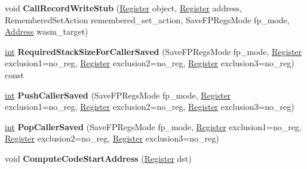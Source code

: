 \begin{DoxyCompactItemize}
void {\bfseries Call\+Record\+Write\+Stub} (\mbox{\hyperlink{classv8_1_1internal_1_1Register}{Register}} object, \mbox{\hyperlink{classv8_1_1internal_1_1Register}{Register}} address, Remembered\+Set\+Action remembered\+\_\+set\+\_\+action, Save\+F\+P\+Regs\+Mode fp\+\_\+mode, \mbox{\hyperlink{classuintptr__t}{Address}} wasm\+\_\+target)
\item 
\mbox{\label{classv8_1_1internal_1_1TurboAssembler_ade281f6d328e2fdd51963e91bda13365}} 
\mbox{\hyperlink{classint}{int}} {\bfseries Required\+Stack\+Size\+For\+Caller\+Saved} (Save\+F\+P\+Regs\+Mode fp\+\_\+mode, \mbox{\hyperlink{classv8_1_1internal_1_1Register}{Register}} exclusion1=no\+\_\+reg, \mbox{\hyperlink{classv8_1_1internal_1_1Register}{Register}} exclusion2=no\+\_\+reg, \mbox{\hyperlink{classv8_1_1internal_1_1Register}{Register}} exclusion3=no\+\_\+reg) const
\item 
\mbox{\label{classv8_1_1internal_1_1TurboAssembler_a05799e0b139129becdabdf8af8e18810}} 
\mbox{\hyperlink{classint}{int}} {\bfseries Push\+Caller\+Saved} (Save\+F\+P\+Regs\+Mode fp\+\_\+mode, \mbox{\hyperlink{classv8_1_1internal_1_1Register}{Register}} exclusion1=no\+\_\+reg, \mbox{\hyperlink{classv8_1_1internal_1_1Register}{Register}} exclusion2=no\+\_\+reg, \mbox{\hyperlink{classv8_1_1internal_1_1Register}{Register}} exclusion3=no\+\_\+reg)
\item 
\mbox{\label{classv8_1_1internal_1_1TurboAssembler_a5f104f3d3c969b063fb4d1dfdc643b1c}} 
\mbox{\hyperlink{classint}{int}} {\bfseries Pop\+Caller\+Saved} (Save\+F\+P\+Regs\+Mode fp\+\_\+mode, \mbox{\hyperlink{classv8_1_1internal_1_1Register}{Register}} exclusion1=no\+\_\+reg, \mbox{\hyperlink{classv8_1_1internal_1_1Register}{Register}} exclusion2=no\+\_\+reg, \mbox{\hyperlink{classv8_1_1internal_1_1Register}{Register}} exclusion3=no\+\_\+reg)
\item 
\mbox{\label{classv8_1_1internal_1_1TurboAssembler_afa16b0e3be91d3616e9f613b954621dd}} 
void {\bfseries Compute\+Code\+Start\+Address} (\mbox{\hyperlink{classv8_1_1internal_1_1Register}{Register}} dst)
\item 
\mbox{\label{classv8_1_1internal_1_1TurboAssembler_a282571b73c77ef466d68a106c557956d}} 

\end{DoxyCompactItemize}
